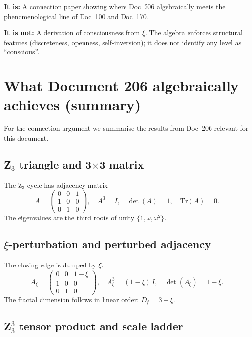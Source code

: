\begin{important}
\textbf{It is:} A connection paper showing where Doc~206 algebraically meets the phenomenological line of Doc~100 and Doc~170.

\textbf{It is not:} A derivation of consciousness from $\xi$. The algebra enforces structural features (discreteness, openness, self-inversion); it does not identify any level as ``conscious''.
\end{important}

\section{What Document 206 algebraically achieves (summary)}\label{sec:doc206_summary}

For the connection argument we summarise the results from Doc~206 relevant for this document.

\subsection{\texorpdfstring{Z$_3$ triangle and 3$\times$3 matrix}{Z3 triangle and 3x3 matrix}}

The Z$_3$ cycle has adjacency matrix
\[
A = \begin{pmatrix} 0 & 0 & 1 \\ 1 & 0 & 0 \\ 0 & 1 & 0 \end{pmatrix},
\quad
A^3 = I, \quad \det(A) = 1, \quad \mathrm{Tr}(A) = 0.
\]
The eigenvalues are the third roots of unity $\{1, \omega, \omega^2\}$.

\subsection{\texorpdfstring{$\xi$-perturbation and perturbed adjacency}{xi-perturbation and perturbed adjacency}}

The closing edge is damped by $\xi$:
\[
A_\xi = \begin{pmatrix} 0 & 0 & 1-\xi \\ 1 & 0 & 0 \\ 0 & 1 & 0 \end{pmatrix},
\quad
A_\xi^3 = (1-\xi)\,I, \quad \det(A_\xi) = 1-\xi.
\]
The fractal dimension follows in linear order: $D_f = 3 - \xi$.

\subsection{\texorpdfstring{Z$_3^3$ tensor product and scale ladder}{Z3-cubed tensor product and scale ladder}}

